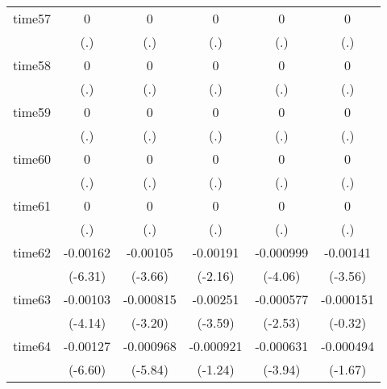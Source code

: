 \begin{table}[htbp]
\begin{tabular}{l*{5}{c}}
time57      &           0         &           0         &           0         &           0         &           0         \\
            &         (.)         &         (.)         &         (.)         &         (.)         &         (.)         \\
time58      &           0         &           0         &           0         &           0         &           0         \\
            &         (.)         &         (.)         &         (.)         &         (.)         &         (.)         \\
time59      &           0         &           0         &           0         &           0         &           0         \\
            &         (.)         &         (.)         &         (.)         &         (.)         &         (.)         \\
time60      &           0         &           0         &           0         &           0         &           0         \\
            &         (.)         &         (.)         &         (.)         &         (.)         &         (.)         \\
time61      &           0         &           0         &           0         &           0         &           0         \\
            &         (.)         &         (.)         &         (.)         &         (.)         &         (.)         \\
time62      &    -0.00162\sym{***}&    -0.00105\sym{***}&    -0.00191\sym{*}  &   -0.000999\sym{***}&    -0.00141\sym{***}\\
            &     (-6.31)         &     (-3.66)         &     (-2.16)         &     (-4.06)         &     (-3.56)         \\
time63      &    -0.00103\sym{***}&   -0.000815\sym{**} &    -0.00251\sym{***}&   -0.000577\sym{*}  &   -0.000151         \\
            &     (-4.14)         &     (-3.20)         &     (-3.59)         &     (-2.53)         &     (-0.32)         \\
time64      &    -0.00127\sym{***}&   -0.000968\sym{***}&   -0.000921         &   -0.000631\sym{***}&   -0.000494         \\
            &     (-6.60)         &     (-5.84)         &     (-1.24)         &     (-3.94)         &     (-1.67)         \\

\end{tabular}
\end{table}
